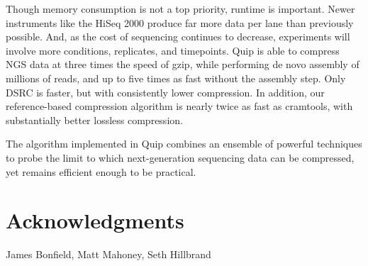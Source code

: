 \documentclass[twocolumn]{article}
\begin{document}
Though memory consumption is not a top priority, runtime is important. Newer
instruments like the HiSeq 2000 produce far more data per lane than previously
possible. And, as the cost of sequencing continues to decrease, experiments
will involve more conditions, replicates, and timepoints.  Quip is able to
compress NGS data at three times the speed of gzip, while performing de novo
assembly of millions of reads, and up to five times as fast without the
assembly step. Only DSRC is faster, but with consistently lower compression.
In addition, our reference-based compression algorithm is nearly twice as fast
as cramtools, with substantially better lossless compression.


The algorithm implemented in Quip combines an ensemble of powerful techniques
to probe the limit to which next-generation sequencing data can be compressed,
yet remains efficient enough to be practical.

\section*{Acknowledgments}

James Bonfield, Matt Mahoney, Seth Hillbrand




\end{document}
